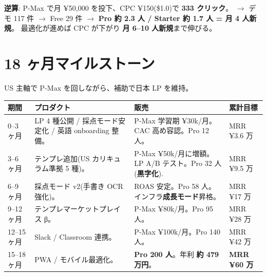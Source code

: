 \documentclass{article}
\newcommand{\hl}[1]{\textcolor{cAlert}{\textbf{#1}}}
\begin{document}
\noindent
\textbf{逆算}: P-Max で月 ¥50,000 を投下、CPC ¥150(\$1.0)で \textbf{333 クリック}。
$\to$ デモ 117 件 $\to$ Free 29 件 $\to$ \hl{Pro 約 2.3 人 / Starter 約 1.7 人 = 月 4 人新規}。
最適化が進めば CPC が下がり \textbf{月 6--10 人新規}まで伸びる。

\section{18 ヶ月マイルストーン}

US 主軸で P-Max を回しながら、補助で日本 LP を維持。

\begin{center}
\end{center}

\begin{table}[h]
\centering
\small
\renewcommand{\arraystretch}{1.2}
\begin{tabular}{lp{4.5cm}p{6cm}p{2.3cm}}
\toprule
\textbf{期間} & \textbf{プロダクト} & \textbf{販売} & \textbf{累計目標} \\
\midrule
0--3 ヶ月  & LP 4 種公開 / 採点モード安定化 / 英語 onboarding 整備。 & P-Max 学習期 ¥30k/月。CAC 高め容認。Pro 12 人。 & MRR ¥3.6 万 \\
3--6 ヶ月  & テンプレ追加(US カリキュラム準拠 5 種)。 & P-Max ¥50k/月に増額。LP A/B テスト。Pro 32 人(\hl{黒字化}). & MRR ¥9.5 万 \\
6--9 ヶ月  & 採点モード v2(手書き OCR 強化)。 & ROAS 安定。Pro 58 人。インフラ\hl{成長モード}昇格。 & MRR ¥17 万 \\
9--12 ヶ月 & テンプレマーケットプレイス β。 & P-Max ¥80k/月。Pro 95 人。 & MRR ¥28 万 \\
12--15 ヶ月& Slack / Classroom 連携。 & P-Max ¥100k/月。Pro 140 人。 & MRR ¥42 万 \\
15--18 ヶ月& PWA / モバイル最適化。 & \hl{Pro 200 人}。年利 \hl{約 479 万円}。 & \hl{MRR ¥60 万} \\
\bottomrule
\end{tabular}
\end{table}
\end{document}
